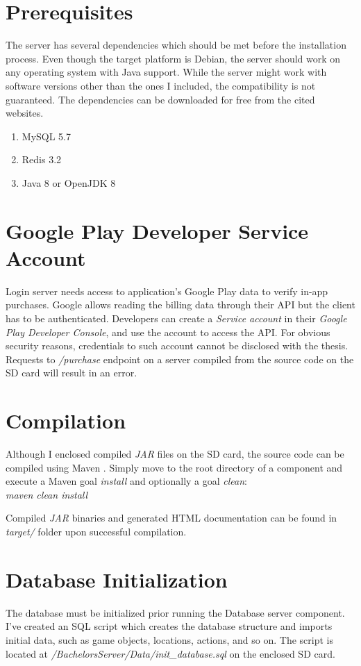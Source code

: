 \section{Prerequisites}
The server has several dependencies which should be met before the installation process. Even though the target platform is Debian, the server should work on any operating system with Java support. While the server might work with software versions other than the ones I included, the compatibility is not guaranteed. The dependencies can be downloaded for free from the cited websites.

\begin{enumerate}
	\item MySQL 5.7 \cite{mysql}
	\item Redis 3.2 \cite{redis}
	\item Java 8 or OpenJDK 8	
\end{enumerate}

\section{Google Play Developer Service Account}
Login server needs access to application's Google Play data to verify in-app purchases. Google allows reading the billing data through their API but the client has to be authenticated. Developers can create a \textit{Service account} in their \textit{Google Play Developer Console}, and use the account to access the API. For obvious security reasons, credentials to such account cannot be disclosed with the thesis. Requests to \textit{/purchase} endpoint on a server compiled from the source code on the SD card will result in an error.

\section{Compilation}
Although I enclosed compiled \textit{JAR} files on the SD card, the source code can be compiled using Maven \cite{maven}. Simply move to the root directory of a component and execute a Maven goal \textit{install} and optionally a goal \textit{clean}:\\
\emph{maven clean install}

Compiled \textit{JAR} binaries and generated HTML documentation can be found in \textit{target/} folder upon successful compilation.

\section{Database Initialization}
The database must be initialized prior running the Database server component. I've created an SQL script which creates the database structure and imports initial data, such as game objects, locations, actions, and so on. The script is located at \textit{/BachelorsServer/Data/init\_database.sql} on the enclosed SD card.


